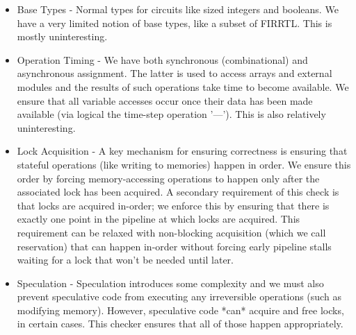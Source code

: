 \documentclass{article}
\begin{document}
\begin{itemize}
\item Base Types - Normal types for circuits like sized integers and booleans.
  We have a very limited notion of base types, like a subset of FIRRTL. This is mostly
  uninteresting.
\item Operation Timing - We have both synchronous (combinational) and asynchronous
  assignment. The latter is used to access arrays and external modules and the results
  of such operations take time to become available. We ensure that all variable
  accesses occur once their data has been made available (via logical the time-step operation '---').
  This is also relatively uninteresting.
\item Lock Acquisition - A key mechanism for ensuring correctness is ensuring
  that stateful operations (like writing to memories) happen in order. We ensure
  this order by forcing memory-accessing operations to happen only after the associated
  lock has been acquired. A secondary requirement of this check is that locks are
  acquired in-order; we enforce this by ensuring that there is exactly one point
  in the pipeline at which locks are acquired. This requirement can be relaxed with
  non-blocking acquisition (which we call reservation) that can happen in-order without
  forcing early pipeline stalls waiting for a lock that won't be needed until later.
\item Speculation - Speculation introduces some complexity and we must also
  prevent speculative code from executing any irreversible operations (such as
  modifying memory). However, speculative code *can* acquire and free locks,
  in certain cases. This checker ensures that all of those happen appropriately.
\end{itemize}

\begin{figure}[h]
  \begin{syntax}
  \end{syntax}
\end{figure}
\end{document}
